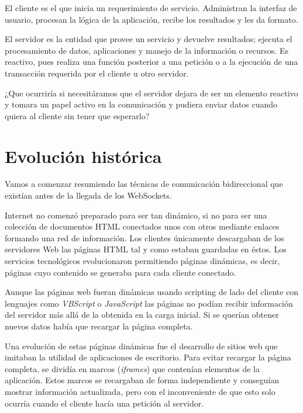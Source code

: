 \documentclass[12pt,a4paper]{article}
\begin{document}
El cliente es el que inicia un requerimiento de servicio. Administran la interfaz de usuario, procesan la lógica de la aplicación, recibe los resultados y les da formato.

El servidor es la entidad que provee un servicio y devuelve resultados; ejecuta el procesamiento de datos, aplicaciones y manejo de la información o recursos. Es reactivo, pues realiza una función posterior a una petición o a la ejecución de una transacción requerida por el cliente u otro servidor.

¿Que ocurriría si necesitáramos que el servidor dejara de ser un elemento reactivo y tomara un papel activo en la comunicación y pudiera enviar datos cuando quiera al cliente sin tener que esperarlo?

\section{Evolución histórica}




Vamos a comenzar resumiendo las técnicas de comunicación bidireccional que existían antes de la llegada de los WebSockets. 

Internet no comenzó preparado para ser tan dinámico, si no para ser una colección de documentos HTML conectados unos con otros mediante enlaces formando una red de información. Los clientes únicamente descargaban de los servidores Web las páginas HTML tal y como estaban guardadas en éstos. Los servicios tecnológicos evolucionaron permitiendo páginas dinámicas, es decir, páginas cuyo contenido se generaba para cada cliente conectado.

Aunque las páginas web fueran dinámicas usando scripting de lado del cliente con lenguajes como \emph{VBScript} o \emph{JavaScript} las páginas no podían recibir información del servidor más allá de la obtenida en la carga inicial. Si se querían obtener nuevos datos había que recargar la página completa.

Una evolución de estas páginas dinámicas fue el desarrollo de sitios web que imitaban la utilidad de aplicaciones de escritorio. Para evitar recargar la página completa, se dividía en marcos (\emph{iframes}) que contenían elementos de la aplicación. Estos marcos se recargaban de forma independiente y conseguían mostrar información actualizada, pero con el inconveniente de que esto solo ocurría cuando el cliente hacía una petición al servidor.
\end{document}
